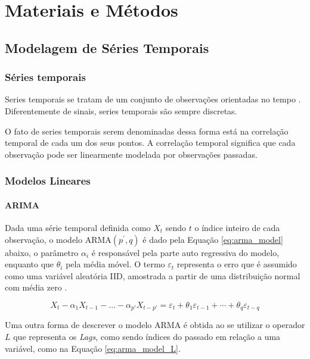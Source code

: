 \chapter{Materiais e Métodos}
\label{cap:materiais_e_metodos}

\section{Modelagem de Séries Temporais}
\label{sec:series_temp}

\subsection{Séries temporais}

Series temporais se tratam de um conjunto de observações orientadas no tempo \cite{brockwell2002introduction}. Diferentemente de sinais, series temporais são sempre discretas.

O fato de series temporais serem denominadas dessa forma está na correlação temporal de cada um dos seus pontos. A correlação temporal significa que cada observação pode ser linearmente modelada por observações passadas. 

\subsection{Modelos Lineares}

\subsubsection{ARIMA}

Dada uma série temporal definida como $X_t$ sendo $t$ o índice inteiro de cada observação, o modelo ARMA$(p^{'},q)$ é dado pela Equação \ref{eq:arma_model} abaixo, o parâmetro $\alpha_i$ é responsável pela parte auto regressiva do modelo, enquanto que $\theta_i$ pela média móvel. O termo $\varepsilon_t$ representa o erro que é assumido como uma variável aleatória IID, amostrada a partir de uma distribuição normal com média zero \cite{brockwell2002introduction}. 

\begin{equation}
\label{eq:arma_model}
    X_t-\alpha_1X_{t-1}- \dots -\alpha_{p'}X_{t-p'} = \varepsilon_t + \theta_1 \varepsilon_{t-1} + \cdots +\theta_q \varepsilon_{t-q}
\end{equation}

Uma outra forma de descrever o modelo ARMA é obtida ao se utilizar o operador $L$ que representa os \textit{Lags}, como sendo índices do passado em relação a uma variável, como na Equação \ref{eq:arma_model_L}.

